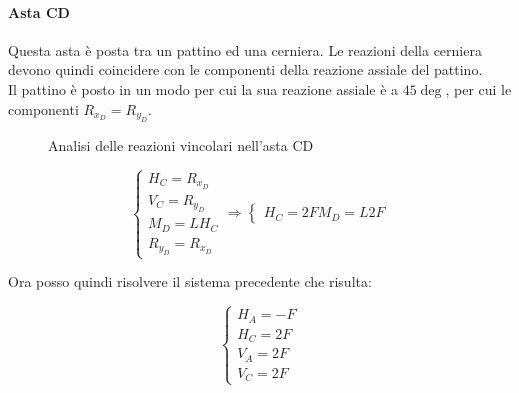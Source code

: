 \documentclass[main.tex]{subfiles}
\begin{document}
\paragraph{Asta CD}
Questa asta è posta tra un pattino ed una cerniera. Le reazioni della cerniera devono quindi coincidere con le componenti della reazione assiale del pattino.
\\

Il pattino è posto in un modo per cui la sua reazione assiale è a $45\deg$, per cui le componenti $R_{x_D}=R_{y_D}$.

\begin{center}
\end{center}

\begin{figure}[H]
\centering
\resizebox{.3\textwidth}{!}{}
\caption{Analisi delle reazioni vincolari nell'asta CD}
\label{asta_CD_2014_2409_2}
\end{figure}

\[
	\begin{cases}
		H_C = R_{x_D}\\
		V_C = R_{y_D}\\
		M_D = LH_C\\
		R_{y_D} = R_{x_D}
	\end{cases}
	\Longrightarrow
	\begin{cases}
		H_C = 2F
		M_D = L2F
	\end{cases}
\]

Ora posso quindi risolvere il sistema precedente che risulta:

\[
\begin{cases}
	H_A = -F	\\
	H_C = 2F\\
	V_A = 2F\\
	V_C = 2F
\end{cases}
\]
\end{document}

